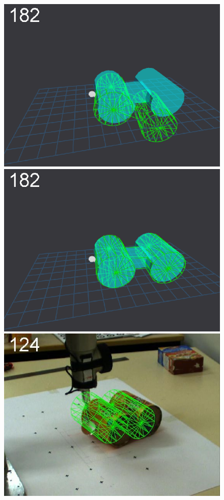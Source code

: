\begin{figure}[t]
{\includegraphics[width=\imgCXwid]{images/C5_2exp_6_3}
\includegraphics[width=\imgCXwid]{images/C5_3exp_6_3}
\includegraphics[width=\imgCXwid]{images/C2_3exp_75_3}
}
\end{figure}
